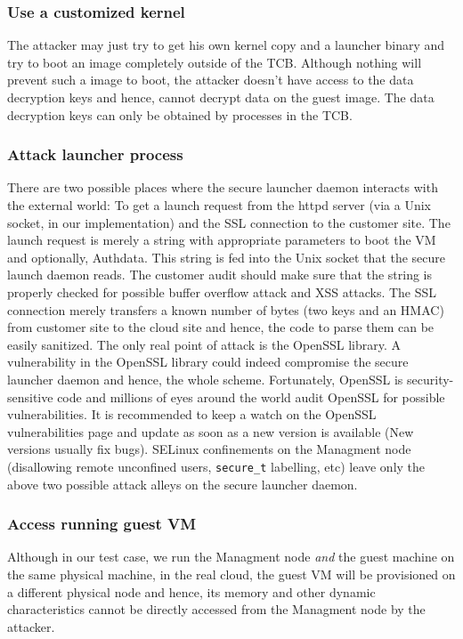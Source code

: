 \documentclass[10pt,twocolumn,pdftex]{article}
\begin{document}
\subsubsection{Use a customized kernel}
The attacker may just try to get his own kernel copy and a launcher binary and try to boot an image completely outside of the TCB. Although nothing will prevent such a image to boot, the attacker doesn't have access to the data decryption keys and hence, cannot decrypt data on the guest image. The data decryption keys can only be obtained by processes in the TCB.

\subsubsection{Attack launcher process}
There are two possible places where the secure launcher daemon interacts with the external world: To get a launch request from the httpd server (via a Unix socket, in our implementation) and the SSL connection to the customer site. The launch request is merely a string with appropriate parameters to boot the VM and optionally, Authdata. This string is fed into the Unix socket that the secure launch daemon reads. The customer audit should make sure that the string is properly checked for possible buffer overflow attack and XSS attacks. The SSL connection merely transfers a known number of bytes (two keys and an HMAC) from customer site to the cloud site and hence, the code to parse them can be easily sanitized. The only real point of attack is the OpenSSL library. A vulnerability in the OpenSSL library could indeed compromise the secure launcher daemon and hence, the whole scheme. Fortunately, OpenSSL is security-sensitive code and millions of eyes around the world audit OpenSSL for possible vulnerabilities. It is recommended to keep a watch on the OpenSSL vulnerabilities page \cite{openssl-vulnerabilities} and update as soon as a new version is available (New versions usually fix bugs). 
SELinux confinements on the Managment node (disallowing remote unconfined users, {\tt secure\_t} labelling, etc) leave only the above two possible attack alleys on the secure launcher daemon.

\subsubsection{Access running guest VM}
Although in our test case, we run the Managment node \emph{and} the guest machine on the same physical machine, in the real cloud, the guest VM will be provisioned on a different physical node and hence, its memory and other dynamic characteristics cannot be directly accessed from the Managment node by the attacker.
\end{document}
